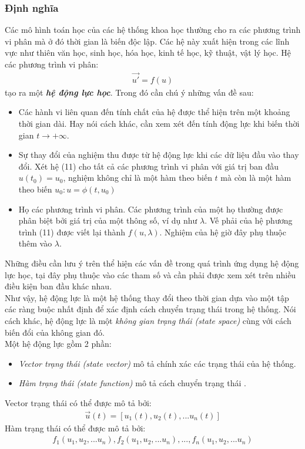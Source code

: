 \subsubsection{Định nghĩa}
Các mô hình toán học của các hệ thống khoa học thường cho ra các phương trình vi phân mà ở đó thời gian là biến độc lập. Các hệ này xuất hiện trong các lĩnh vực như thiên văn học, sinh học, hóa học, kinh tế học, kỹ thuật, vật lý học. Hệ các phương trình vi phân:
\begin{align}
    \Vec{u'} = f(u)
\end{align}
tạo ra một \textbf{\textit{hệ động lực học}}. Trong đó cần chú ý những vấn đề sau:
\begin{itemize}
    \item Các hành vi liên quan đến tính chất của hệ được thể hiện trên một khoảng thời gian dài. Hay nói cách khác, cần xem xét đến tính động lực khi biến thời gian $t\to+\infty$.
    \item Sự thay đổi của nghiệm thu được từ hệ động lực khi các dữ liệu đầu vào thay đổi. Xét hệ (11) cho tất cả các phương trình vi phân với giá trị ban đầu $u(t_0) = u_0$, nghiệm không chỉ là một hàm theo biến $t$ mà còn là một hàm theo biến $u_0: u = \phi(t, u_0)$
    \item Họ các phương trình vi phân. Các phương trình của một họ thường được phân biệt bởi giá trị của một thông số, ví dụ như $\lambda$. Vế phải của hệ phương trình (11) được viết lại thành $f(u, \lambda)$. Nghiệm của hệ giờ đây phụ thuộc thêm vào $\lambda$.
\end{itemize}
Những điều cần lưu ý trên thể hiện các vấn đề trong quá trình ứng dụng hệ động lực học, tại đây phụ thuộc vào các tham số và cần phải được xem xét trên nhiều điều kiện ban đầu khác nhau.\\
Như vậy, hệ động lực là một hệ thống thay đổi theo thời gian dựa vào một tập các ràng buộc nhất định để xác định cách chuyển trạng thái trong hệ thống. Nói cách khác, hệ động lực là một \textit{không gian trạng thái (state space)} cùng với cách biến đổi của không gian đó.\\
Một hệ động lực gồm 2 phần:
\begin{itemize}
    \item \textit{Vector trạng thái (state vector)} mô tả chính xác các trạng thái của hệ thống. 
    \item \textit{Hàm trạng thái (state function)} mô tả cách chuyển trạng thái .
\end{itemize}
Vector trạng thái có thể được mô tả bởi:
\begin{align*}
    \Vec{u}(t)=[u_1(t), u_2(t),...u_n(t)]
\end{align*}
Hàm trạng thái có thể được mô tả bởi:
\begin{align*}
    f_1(u_1,u_2,...u_n), f_2(u_1,u_2,...u_n),..., f_n(u_1,u_2,...u_n)
\end{align*}
